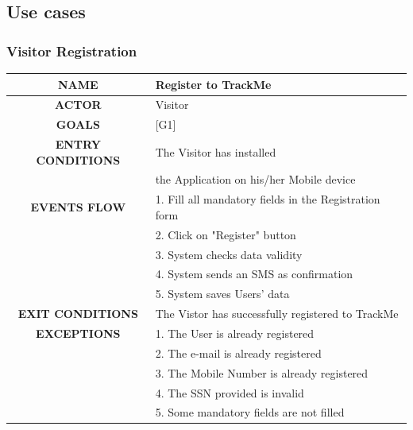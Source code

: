 \documentclass[12pt,a4paper]{article}
\begin{document}
	\newpage
	\subsection{Use cases}
		\subsubsection{Visitor Registration}
		\begin{center}
			\begin{tabular}{| c | l |}
				\hline
				\textbf{NAME} & Register to TrackMe \\
				\hline
				\textbf{ACTOR} & Visitor \\
				\hline
				\textbf{GOALS} & [G1] \\
				\hline
				\textbf{ENTRY CONDITIONS} & The Visitor has installed \\
				&	the Application on his/her Mobile device \\ \hline
				\textbf{EVENTS FLOW}  &
				1. Fill all mandatory fields in the Registration form\\
				&2. Click on "Register" button\\
				&3. System checks data validity\\
				&4. System sends an SMS as confirmation\\
				&5. System saves Users' data\\
				\hline
				\textbf{EXIT CONDITIONS}  & The Vistor has successfully registered to TrackMe\\ \hline
				\textbf{EXCEPTIONS} &
				1. The User is already registered\\
				&2. The e-mail is already registered\\
				&3. The Mobile Number is already registered\\
				&4. The SSN provided is invalid\\
				&5. Some mandatory fields are not filled\\
				\hline
			\end{tabular}
		\end{center}
\end{document}
